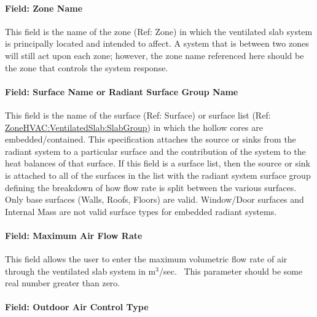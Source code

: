 \paragraph{Field: Zone Name}\label{field-zone-name-4-004}

This field is the name of the zone (Ref: Zone) in which the ventilated slab system is principally located and intended to affect. A system that is between two zones will still act upon each zone; however, the zone name referenced here should be the zone that controls the system response.

\paragraph{Field: Surface Name or Radiant Surface Group Name}\label{field-surface-name-or-radiant-surface-group-name-3}

This field is the name of the surface (Ref: Surface) or surface list (Ref: \hyperref[zonehvacventilatedslabslabgroup]{ZoneHVAC:VentilatedSlab:SlabGroup}) in which the hollow cores are embedded/contained. This specification attaches the source or sinks from the radiant system to a particular surface and the contribution of the system to the heat balances of that surface. If this field is a surface list, then the source or sink is attached to all of the surfaces in the list with the radiant system surface group defining the breakdown of how flow rate is split between the various surfaces. Only base surfaces (Walls, Roofs, Floors) are valid. Window/Door surfaces and Internal Mass are not valid surface types for embedded radiant systems.

\paragraph{Field: Maximum Air Flow Rate}\label{field-maximum-air-flow-rate-001}

This field allows the user to enter the maximum volumetric flow rate of air through the ventilated slab system in m\(^{3}\)/sec.~ This parameter should be some real number greater than zero.

\paragraph{Field: Outdoor Air Control Type}\label{field-outdoor-air-control-type}

